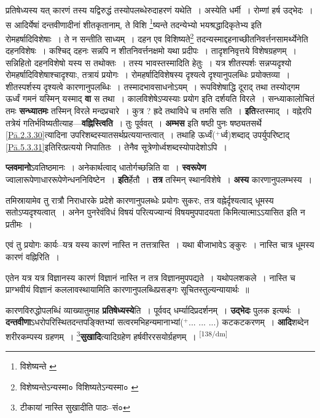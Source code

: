 \documentclass[article,12pt,a4paper]{memoir}
\newcommand{\add}[1]{($^{+}$#1)}
\begin{document}
	प्रतिषेध्यस्य यत् कारणं तस्य यद्विरुद्धं तस्योपलब्धेरुदाहरणं यथेति । अस्येति धर्मी । रोम्णां हर्ष उद्भेदः । स आदिर्येषां दन्तवीणादीनां शीतकृतानाम्, ते विशि \footnote{विशेष्यन्ते \cite{dp-msB}}ष्यन्ते तदन्येभ्यो भयश्रद्धादिकृतेभ्य इति रोमहर्षादिविशेषाः । ते न सन्तीति साध्यम् । दहन एव विशिष्यते\footnote{विशेष्यन्तेऽन्यस्मा० \cite{dp-msB} विशिष्यतेऽन्यस्मा० \cite{dp-msC} \cite{dp-msD}} तदन्यस्माद्दहनाच्छीतनिवर्त्तनसामर्थ्येनेति दहनविशेषः । कश्चिद् दहनः सन्नपि न शीतनिवर्त्तनक्षमो यथा प्रदीपः । तादृशनिवृत्तये विशेषग्रहणम् । सन्निहितो दहनविशेषो यस्य स तथोक्तः । तस्य भावस्तस्मादिति हेतुः । यत्र शीतस्पर्शः सन्नप्यदृश्यो रोमहर्षादिविशेषाश्चादृश्याः, तत्रायं प्रयोगः । रोमहर्षादिविशेषस्य दृश्यत्वे दृश्यानुपलब्धिः प्रयोक्तव्या । शीतस्पर्शस्य दृश्यत्वे कारणानुपलब्धिः । तस्मादभावसाधनोऽयम् । रूपविशेषाद्धि दूराद् तथा तस्योद्गम ऊर्ध्वं गमनं यस्मिन् यस्माद् \textbf{वा} स तथा । कालविशेषेऽप्यस्याः प्रयोग इति दर्शयति विरले । सन्ध्याकालोचितं तमः \textbf{सन्ध्यातमः} तस्मिन् विरले मन्दप्रचारे । कुत्र ? ह्रदे तथाविधे च तमसि सति । \textbf{इति}स्तस्माद् । वह्नेरपि तत्रेयं गतिर्भविष्यतीत्याह—\textbf{वह्निस्त्विति} । तुः पूर्ववत् । \textbf{अम्भस} इति षष्ठी पुनः षष्ठ्यतसर्थे \cref{Pā.2.3.30}त्यादिना उपरिशब्दस्यातसर्थप्रत्ययान्तत्वात् । तथाहि ऊर्ध्वं\add{र्ध्व}शब्दाद् उपर्युपरिष्टाद् \cref{Pā.5.3.31}इतिरित्प्रत्ययो निपातितः । तेनैव सूत्रेणोर्ध्वशब्दस्योपादेशोऽपि ।
	\pend
      

	  \pstart \textbf{प्लवमानो}ऽवतिष्ठमानः । अनेकार्थत्वाद् धातोर्गच्छन्निति वा । \textbf{स्वरूपेण} ज्वालारूपेणाधाररूपेणेन्धननिविष्टेन । \textbf{इति}र्हेतौ । \textbf{तत्र} तस्मिन् स्थानविशेषे । \textbf{अस्य} कारणानुपलम्भस्य ।
	\pend
      

	  \pstart तमिस्रायामेव तु रात्रौ निराधारके प्रदेशे कारणानुपलब्धेः प्रयोगः सुकरः, तत्र वह्नेर्दृश्यत्वाद् धूमस्य सतोऽप्यदृश्यत्वात् । अनेन पुनरेवंविधं विषयं परित्यज्यान्यं विषयमुपपादयता किमित्यात्माऽऽयासित इति न प्रतीमः ।
	\pend
      

	  \pstart एवं तु प्रयोगः कार्यः--यत्र यस्य कारणं नास्ति न तत्तत्रास्ति । यथा बीजाभावेऽ ङ्कुरः । नास्ति चात्र धूमस्य कारणं वह्निरिति ।
	\pend
      

	  \pstart एतेन यत्र यत्र विज्ञानस्य कारणं विज्ञानं नास्ति न तत्र विज्ञानमुपपद्यते । यथोपलशकले । नास्ति च प्राग्भवीयं विज्ञानं कललावस्थायामिति कारणानुपलब्धिप्रसङ्गः सूचितस्तुल्यन्यायार्थः ॥
	\pend
      

	  \pstart कारणविरुद्धोपलब्धिं व्याख्यातुमाह \textbf{प्रतिषेध्यस्ये}ति । पूर्ववद् धर्म्यादिप्रदर्शनम् । \textbf{उद्भेदः} पुलक इत्यर्थः । \textbf{दन्तवीणा}ऽधरोपरिस्थितदन्तपङ्क्तिभ्यां सत्वरमभिहन्यमानाभ्यां\add{... ... ...} कटकटकरणम् । \textbf{आदि}शब्देन शरीरकम्पस्य ग्रहणम् । \footnote{टीकायां नास्ति सुखादीति पाठः--सं०}\textbf{सुखादि}त्यादिग्रहेण हर्षवीररसयोर्ग्रहणम् ।
	\pend
      \leavevmode\textsuperscript{\rmlatinfont\tiny [138/dm]}
\end{document}
